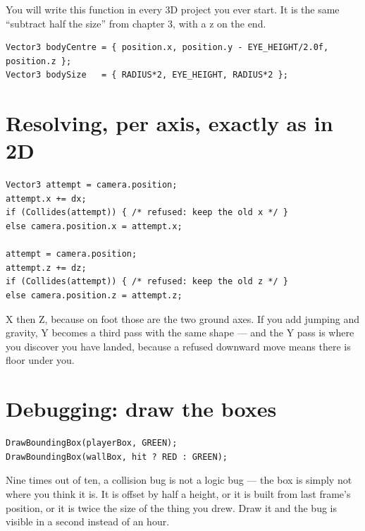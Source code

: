 You will write this function in every 3D project you ever start. It is the same
``subtract half the size'' from chapter 3, with a z on the end.


\begin{lstlisting}
Vector3 bodyCentre = { position.x, position.y - EYE_HEIGHT/2.0f, position.z };
Vector3 bodySize   = { RADIUS*2, EYE_HEIGHT, RADIUS*2 };
\end{lstlisting}

\section{Resolving, per axis, exactly as in 2D}

\begin{lstlisting}
Vector3 attempt = camera.position;
attempt.x += dx;
if (Collides(attempt)) { /* refused: keep the old x */ }
else camera.position.x = attempt.x;

attempt = camera.position;
attempt.z += dz;
if (Collides(attempt)) { /* refused: keep the old z */ }
else camera.position.z = attempt.z;
\end{lstlisting}

X then Z, because on foot those are the two ground axes. If you add jumping and
gravity, Y becomes a third pass with the same shape --- and the Y pass is where
you discover you have landed, because a refused downward move means there is
floor under you.


\section{Debugging: draw the boxes}

\begin{lstlisting}
DrawBoundingBox(playerBox, GREEN);
DrawBoundingBox(wallBox, hit ? RED : GREEN);
\end{lstlisting}

Nine times out of ten, a collision bug is not a logic bug --- the box is simply
not where you think it is. It is offset by half a height, or it is built from
last frame's position, or it is twice the size of the thing you drew. Draw it and
the bug is visible in a second instead of an hour.

